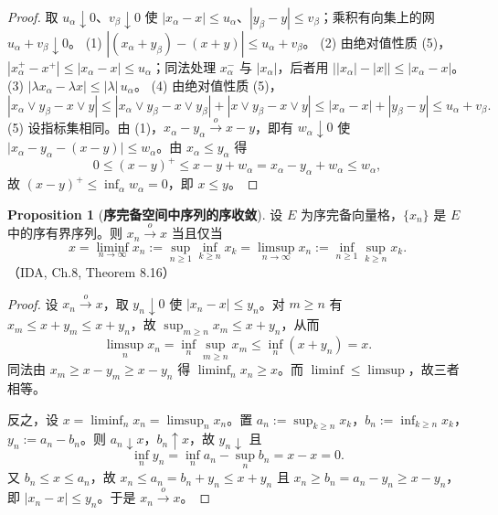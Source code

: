 \documentclass[oneside]{book}
\theoremstyle{definition}
\theoremstyle{definition}
\newtheorem{proposition}{Proposition}[section]
\begin{document}
	\begin{proof}
		取 $u_{\alpha}\downarrow0$、$v_{\beta}\downarrow0$ 使 $|x_{\alpha}-x|\leqslant u_{\alpha}$、$|y_{\beta}-y|\leqslant v_{\beta}$；乘积有向集上的网 $u_{\alpha}+v_{\beta}\downarrow0$。
		(1) $|(x_{\alpha}+y_{\beta})-(x+y)|\leqslant u_{\alpha}+v_{\beta}$。
		(2) 由绝对值性质 (5)，$|x_{\alpha}^{+}-x^{+}|\leqslant|x_{\alpha}-x|\leqslant u_{\alpha}$；同法处理 $x_{\alpha}^{-}$ 与 $|x_{\alpha}|$，后者用 $\big||x_{\alpha}|-|x|\big|\leqslant|x_{\alpha}-x|$。
		(3) $|\lambda x_{\alpha}-\lambda x|\leqslant|\lambda|\,u_{\alpha}$。
		(4) 由绝对值性质 (5)，
		\[
		|x_{\alpha}\vee y_{\beta}-x\vee y|\leqslant|x_{\alpha}\vee y_{\beta}-x\vee y_{\beta}|+|x\vee y_{\beta}-x\vee y|\leqslant|x_{\alpha}-x|+|y_{\beta}-y|\leqslant u_{\alpha}+v_{\beta}.
		\]
		(5) 设指标集相同。由 (1)，$x_{\alpha}-y_{\alpha}\xrightarrow{\,o\,}x-y$，即有 $w_{\alpha}\downarrow0$ 使 $\big|x_{\alpha}-y_{\alpha}-(x-y)\big|\leqslant w_{\alpha}$。由 $x_{\alpha}\leqslant y_{\alpha}$ 得
		\[
		0\leqslant(x-y)^{+}\leqslant x-y+w_{\alpha}=x_{\alpha}-y_{\alpha}+w_{\alpha}\leqslant w_{\alpha},
		\]
		故 $(x-y)^{+}\leqslant\inf_{\alpha}w_{\alpha}=0$，即 $x\leqslant y$。
	\end{proof}
	
	\begin{proposition}[\bfseries{序完备空间中序列的序收敛}]
		设 $E$ 为序完备向量格，$\{x_{n}\}$ 是 $E$ 中的序有界序列。则 $x_{n}\xrightarrow{\,o\,}x$ 当且仅当
		\[
		x=\liminf_{n\to\infty}x_{n}:=\sup_{n\geqslant1}\inf_{k\geqslant n}x_{k}
		=\limsup_{n\to\infty}x_{n}:=\inf_{n\geqslant1}\sup_{k\geqslant n}x_{k}.
		\]
		（IDA, Ch.8, Theorem 8.16）
	\end{proposition}
	
	\begin{proof}
		设 $x_{n}\xrightarrow{\,o\,}x$，取 $y_{n}\downarrow0$ 使 $|x_{n}-x|\leqslant y_{n}$。对 $m\geqslant n$ 有 $x_{m}\leqslant x+y_{m}\leqslant x+y_{n}$，故 $\sup_{m\geqslant n}x_{m}\leqslant x+y_{n}$，从而
		\[
		\limsup_{n}x_{n}=\inf_{n}\sup_{m\geqslant n}x_{m}\leqslant\inf_{n}(x+y_{n})=x .
		\]
		同法由 $x_{m}\geqslant x-y_{m}\geqslant x-y_{n}$ 得 $\liminf_{n}x_{n}\geqslant x$。而 $\liminf\leqslant\limsup$，故三者相等。
		
		反之，设 $x=\liminf_{n}x_{n}=\limsup_{n}x_{n}$。置 $a_{n}:=\sup_{k\geqslant n}x_{k}$，$b_{n}:=\inf_{k\geqslant n}x_{k}$，$y_{n}:=a_{n}-b_{n}$。则 $a_{n}\downarrow x$，$b_{n}\uparrow x$，故 $y_{n}\downarrow$ 且
		\[
		\inf_{n}y_{n}=\inf_{n}a_{n}-\sup_{n}b_{n}=x-x=0 .
		\]
		又 $b_{n}\leqslant x\leqslant a_{n}$，故 $x_{n}\leqslant a_{n}=b_{n}+y_{n}\leqslant x+y_{n}$ 且 $x_{n}\geqslant b_{n}=a_{n}-y_{n}\geqslant x-y_{n}$，即 $|x_{n}-x|\leqslant y_{n}$。于是 $x_{n}\xrightarrow{\,o\,}x$。
	\end{proof}
	
\end{document}
